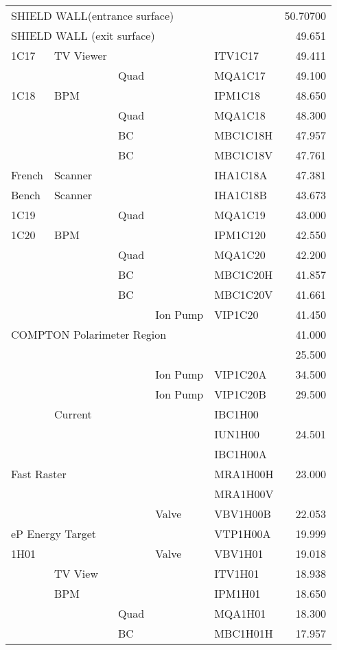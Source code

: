 {\begin{longtable}[hpt]{lllllr}
\multicolumn{5}{l}{SHIELD WALL(entrance surface)} & 50.70700 \\
\multicolumn{5}{l}{SHIELD WALL (exit surface)} &  49.651 \\
\hline
1C17 & TV Viewer &&& ITV1C17 & 49.411 \\
&& Quad && MQA1C17 & 49.100 \\
1C18 & BPM &&& IPM1C18 & 48.650 \\
&& Quad && MQA1C18 & 48.300 \\
&& BC && MBC1C18H & 47.957 \\
&& BC && MBC1C18V & 47.761 \\ \hline
French & Scanner &&& IHA1C18A & 47.381 \\
Bench & Scanner &&& IHA1C18B & 43.673 \\ \hline
1C19 && Quad && MQA1C19 & 43.000 \\
1C20 & BPM &&& IPM1C120 & 42.550 \\
&& Quad && MQA1C20 & 42.200 \\
&& BC && MBC1C20H & 41.857 \\
&& BC && MBC1C20V & 41.661 \\
&&& Ion Pump & VIP1C20 & 41.450 \\ \hline
\multicolumn{5}{l}{COMPTON Polarimeter Region} & 41.000 \\
& &&&& 25.500 \\
&&& Ion Pump & VIP1C20A & 34.500 \\
&&& Ion Pump & VIP1C20B & 29.500 \\ \hline
& Current &&& IBC1H00 & \\
&&&& IUN1H00 & 24.501 \\
&&&& IBC1H00A & \\
\multicolumn{2}{l}{Fast Raster} &&& MRA1H00H & 23.000 \\ 
&&&& MRA1H00V & \\ 
&&& Valve & VBV1H00B & 22.053 \\
\multicolumn{2}{l}{eP Energy Target} &&& VTP1H00A & 19.999 \\
1H01 &&& Valve & VBV1H01 & 19.018 \\
& TV View &&& ITV1H01 & 18.938 \\
& BPM &&& IPM1H01 & 18.650 \\
&& Quad && MQA1H01 & 18.300 \\
&& BC && MBC1H01H & 17.957 \\

\end{longtable}}
